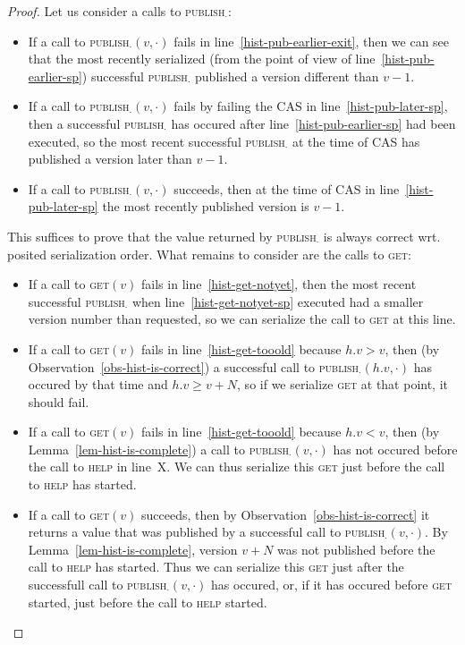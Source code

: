 \documentclass[a4paper,11pt]{article}
\newcommand{\fn}[1]{\textsc{#1}}
\begin{document}
\begin{proof}
Let us consider a calls to \fn{publish$_\cdot$}:
\begin{itemize}
\item If a call to \fn{publish$_\cdot$}$(v, \cdot)$ fails in line~\ref{hist-pub-earlier-exit}, then we can see that the most recently serialized (from the point of view of line~\ref{hist-pub-earlier-sp}) successful \fn{publish$_\cdot$} published a version different than $v-1$.
\item If a call to \fn{publish$_\cdot$}$(v, \cdot)$ fails by failing the CAS in line~\ref{hist-pub-later-sp}, then a successful \fn{publish$_\cdot$} has occured after line~\ref{hist-pub-earlier-sp} had been executed, so the most recent successful \fn{publish$_\cdot$} at the time of CAS has published a version later than $v-1$.
\item If a call to \fn{publish$_\cdot$}$(v, \cdot)$ succeeds, then at the time of CAS in line~\ref{hist-pub-later-sp} the most recently published version is $v-1$.
	\end{itemize}
	This suffices to prove that the value returned by \fn{publish$_\cdot$} is always correct wrt. posited
	serialization order. What remains to consider are the calls to \fn{get}:
\begin{itemize}
	\item If a call to \fn{get}$(v)$ fails in line~\ref{hist-get-notyet}, then the most recent successful \fn{publish$_\cdot$} when line~\ref{hist-get-notyet-sp} executed had a smaller version number than requested, so we can serialize the call to \fn{get} at this line.
	\item If a call to \fn{get}$(v)$ fails in line~\ref{hist-get-tooold} because $h.v > v$, then (by Observation~\ref{obs-hist-is-correct}) a successful call to \fn{publish$_\cdot$}$(h.v, \cdot)$ has occured by that time and $h.v \geq v+N$, so if we serialize \fn{get} at that point, it should fail.
	\item If a call to \fn{get}$(v)$ fails in line~\ref{hist-get-tooold} because $h.v < v$, then (by Lemma~\ref{lem-hist-is-complete}) a call to \fn{publish$_\cdot$}$(v, \cdot)$ has not occured before the call to \fn{help} in line~X. We can thus serialize this \fn{get} just before the call to \fn{help} has started.
	\item If a call to \fn{get}$(v)$ succeeds, then by Observation~\ref{obs-hist-is-correct} it returns a value that was published by a successful call to \fn{publish$_\cdot$}$(v, \cdot)$. By Lemma~\ref{lem-hist-is-complete}, version $v+N$ was not published before the call to \fn{help} has started. Thus we can serialize this \fn{get} just after the successfull call to \fn{publish$_\cdot$}$(v, \cdot)$ has occured, or, if it has occured before \fn{get} started, just before the call to \fn{help} started.
\end{itemize}
\end{proof}
\end{document}
